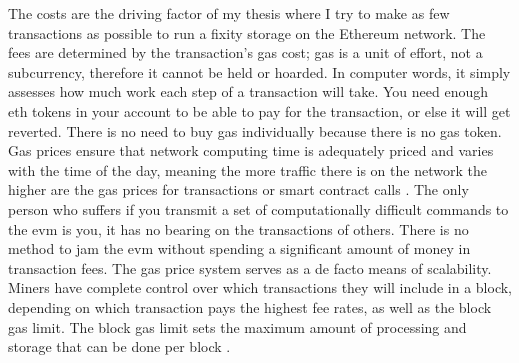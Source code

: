 The costs are the driving factor of my thesis where I try to make as few transactions as possible to run a fixity storage on the Ethereum network. 
The fees are determined by the transaction's gas cost; gas is a unit of effort, not a subcurrency, therefore it cannot be held or hoarded. In computer words, it simply assesses how much work each step of a transaction will take. You need enough \acrlong{eth} tokens in your account to be able to pay for the transaction, or else it will get reverted. There is no need to buy gas individually because there is no gas token. Gas prices ensure that network computing time is adequately priced and varies with the time of the day, meaning the more traffic there is on the network the higher are the gas prices for transactions or smart contract calls \cite[59]{dannen2017introducing}.
The only person who suffers if you transmit a set of computationally difficult commands to the \acrshort{evm} is you, it has no bearing on the transactions of others. There is no method to jam the \acrlong{evm} without spending a significant amount of money in transaction fees. The gas price system serves as a de facto means of scalability. Miners have complete control over which transactions they will include in a block, depending on which transaction pays the highest fee rates, as well as the block gas limit. The block gas limit sets the maximum amount of processing and storage that can be done per block \cite[60]{dannen2017introducing}. 

